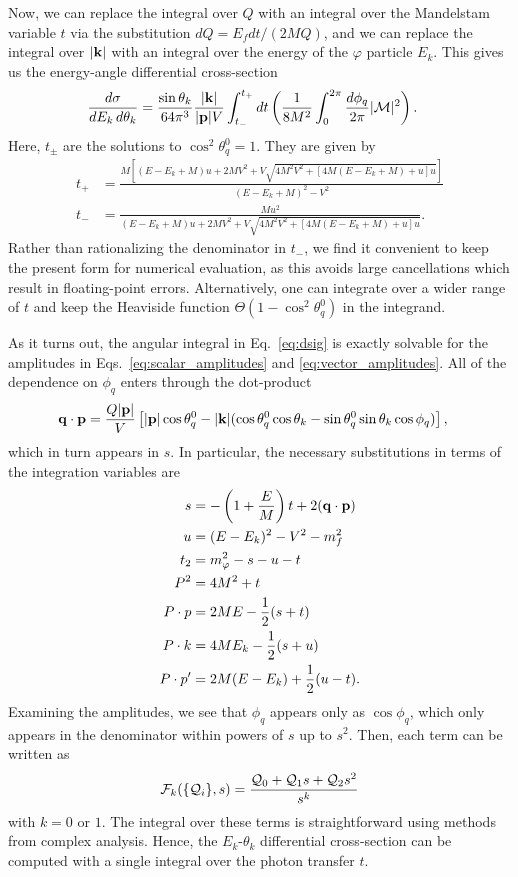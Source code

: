 Now, we can replace the integral over $Q$ with an integral over the Mandelstam variable $t$ via the substitution $dQ = E_f dt/(2MQ)$, and we can replace the integral over $|{\bf k}|$ with an integral over the energy of the $\varphi$ particle $E_k$. This gives us the energy-angle differential cross-section
\begin{align}
    \frac{d\sigma}{dE_k\,d\theta_k} &= \frac{\sin{\theta_k}}{64\pi^3}\frac{|{\bf k}|}{|{\bf p}|V}\int_{t_-}^{t_+}dt\left(\frac{1}{8M^2}\int_0^{2\pi}\frac{d\phi_q}{2\pi}|{\cal M}|^2\right).\label{eq:dsig}
\end{align}
Here, $t_{\pm}$ are the solutions to $\cos^2{\theta_{q}^0} = 1$. They are given by
\begin{align}
    t_+ &= \frac{M\left[(E-E_k+M)u + 2MV^2 + V\sqrt{4M^2V^2+[4M(E-E_k+M) + u]u}\right]}{(E-E_k+M)^2 - V^2} \label{eq:t_+}\\
    t_- &= \frac{Mu^2}{(E-E_k+M)u + 2MV^2 + V\sqrt{4M^2V^2+[4M(E-E_k+M) + u]u}}.\label{eq:t_-}
\end{align}
Rather than rationalizing the denominator in $t_-$, we find it convenient to keep the present form for numerical evaluation, as this avoids large cancellations which result in floating-point errors. Alternatively, one can integrate over a wider range of $t$ and keep the Heaviside function $\Theta(1-\cos^2{\theta_q^0})$ in the integrand.

As it turns out, the angular integral in Eq.~\ref{eq:dsig} is exactly solvable for the amplitudes in Eqs.~\ref{eq:scalar_amplitudes} and \ref{eq:vector_amplitudes}. All of the dependence on $\phi_q$ enters through the dot-product
\begin{align}
    {\bf q}\cdot{\bf p} &= \frac{Q|{\bf p}|}{V}\left[|{\bf p}|\cos{\theta_q^0} - |{\bf k}|(\cos{\theta_q^0}\cos{\theta_k} - \sin{\theta_q^0}\sin{\theta_k}\cos{\phi_q})\right],
\end{align}
which in turn appears in $s$. In particular, the necessary substitutions in terms of the integration variables are
\begin{align}
    s &= -\left(1+\frac{E}{M}\right)t + 2({\bf q}\cdot{\bf p}) \label{eq:s}\\
    u &= (E-E_k)^2 - V^2 - m_f^2\\ 
    t_2 &= m_\varphi^2 - s - u - t\\
    P^2 &= 4M^2 + t\\
    P\cdot p &= 2ME - \frac{1}{2}(s+t)\\
    P\cdot k &= 4ME_k - \frac{1}{2}(s+u)\\
    P\cdot p'&= 2M(E - E_k) + \frac{1}{2}(u-t).
\end{align}
Examining the amplitudes, we see that $\phi_q$ appears only as $\cos{\phi_q}$, which only appears in the denominator within powers of $s$ up to $s^2$. Then, each term can be written as
\begin{align}
    {\cal F}_k(\{{\cal Q}_i\}, s) = \frac{{\cal Q}_0 + {\cal Q}_1 s + {\cal Q}_2 s^2}{s^k}
\end{align}
with $k = 0$ or $1$. The integral over these terms is straightforward using methods from complex analysis. Hence, the $E_k$-$\theta_k$ differential cross-section can be computed with a single integral over the photon transfer $t$. 

